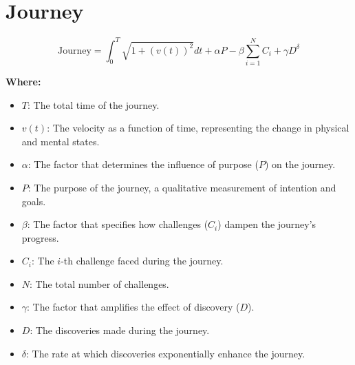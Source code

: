 \chapter{Journey}

\begin{equation}
\text{Journey} = \int_{0}^{T} \sqrt{1 + (v(t))^2} dt + \alpha P - \beta \sum_{i=1}^{N} C_i + \gamma D^{\delta}
\end{equation}

\textbf{Where:}

\begin{itemize}
    \item $T$: The total time of the journey.
    \item $v(t)$: The velocity as a function of time, representing the change in physical and mental states.
    \item $\alpha$: The factor that determines the influence of purpose ($P$) on the journey.
    \item $P$: The purpose of the journey, a qualitative measurement of intention and goals.
    \item $\beta$: The factor that specifies how challenges ($C_i$) dampen the journey's progress.
    \item $C_i$: The $i$-th challenge faced during the journey.
    \item $N$: The total number of challenges.
    \item $\gamma$: The factor that amplifies the effect of discovery ($D$).
    \item $D$: The discoveries made during the journey.
    \item $\delta$: The rate at which discoveries exponentially enhance the journey.
\end{itemize}